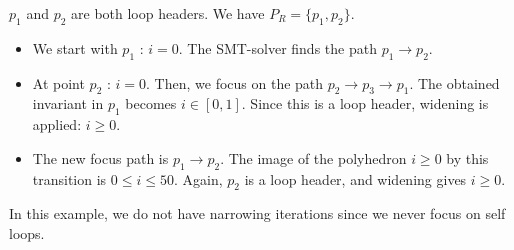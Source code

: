 \documentclass[a4paper,english,titlepage,11pt]{report}
\begin{document}
$p_1$ and $p_2$ are both loop headers. We have $P_R = \{p_1, p_2\}$.

\begin{itemize}
\item We start with $p_1$ : $i=0$. The SMT-solver finds the path $p_1 \rightarrow p_2$.
\item At point $p_2$ : $i=0$. Then, we focus on the path $p_2 \rightarrow p_3 \rightarrow p_1$.
The obtained invariant in $p_1$ becomes $i \in [0,1]$. 
Since this is a loop header, widening is applied: $i \geq 0$.
\item The new focus path is $p_1 \rightarrow p_2$. The image of the polyhedron $i
\geq 0$ by this transition is $0 \leq i \leq 50$. Again, $p_2$  is a loop
header, and widening gives $i \geq 0$.
\end{itemize}
In this example, we do not have narrowing iterations since we never focus on self
loops.
\end{document}

